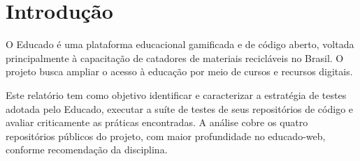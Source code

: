 \section{Introdução}

O Educado é uma plataforma educacional gamificada e de código aberto, voltada principalmente à capacitação de catadores de materiais recicláveis no Brasil.
O projeto busca ampliar o acesso à educação por meio de cursos e recursos digitais.

Este relatório tem como objetivo identificar e caracterizar a estratégia de testes
adotada pelo Educado, executar a suíte de testes de seus repositórios de código e avaliar
criticamente as práticas encontradas. A análise cobre os quatro repositórios públicos do
projeto, com maior profundidade no educado-web, conforme recomendação da disciplina.